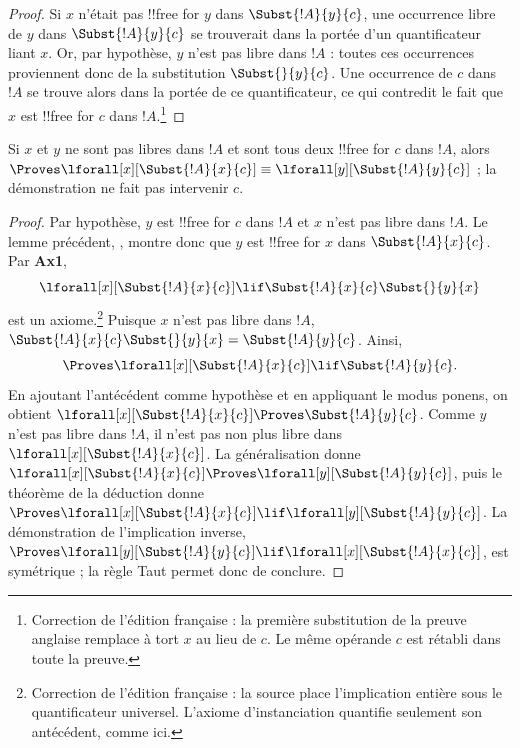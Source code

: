 \documentclass[../../../include/open-logic-section]{subfiles}
\begin{document}
\begin{proof}
Si $x$ n'était pas !!{free for} $y$ dans
$\Subst{!A}{y}{c}$, une occurrence libre de $y$ dans
$\Subst{!A}{y}{c}$ se trouverait dans la portée d'un
quantificateur liant $x$. Or, par hypothèse, $y$ n'est
pas libre dans $!A$ : toutes ces occurrences proviennent
donc de la substitution $\Subst{}{y}{c}$. Une occurrence
de $c$ dans $!A$ se trouve alors dans la portée de ce
quantificateur, ce qui contredit le fait que $x$ est
!!{free for} $c$ dans $!A$.\footnote{Correction de l'édition
française : la première substitution de la preuve anglaise
remplace à tort $x$ au lieu de $c$. Le même opérande $c$
est rétabli dans toute la preuve.}
\end{proof}

\begin{lem}
Si $x$ et $y$ ne sont pas libres dans $!A$ et sont tous deux
!!{free for} $c$ dans $!A$, alors
$\Proves\lforall[x][\Subst{!A}{x}{c}]
\equiv\lforall[y][\Subst{!A}{y}{c}]$ ; la démonstration
ne fait pas intervenir $c$.
\end{lem}

\begin{proof}
Par hypothèse, $y$ est !!{free for} $c$ dans $!A$ et
$x$ n'est pas libre dans $!A$. Le lemme précédent,
, montre donc que $y$ est !!{free for}
$x$ dans $\Subst{!A}{x}{c}$. Par \textbf{Ax1},
\[
\lforall[x][\Subst{!A}{x}{c}]
\lif\Subst{!A}{x}{c}\Subst{}{y}{x}
\]
est un axiome.\footnote{Correction de l'édition française :
la source place l'implication entière sous le quantificateur
universel. L'axiome d'instanciation quantifie seulement son
antécédent, comme ici.}
Puisque $x$ n'est pas libre dans $!A$,
$\Subst{!A}{x}{c}\Subst{}{y}{x}=\Subst{!A}{y}{c}$.
Ainsi,
\[
\Proves\lforall[x][\Subst{!A}{x}{c}]
\lif\Subst{!A}{y}{c}.
\]
En ajoutant l'antécédent comme hypothèse et en appliquant le
modus ponens, on obtient
$\lforall[x][\Subst{!A}{x}{c}]\Proves\Subst{!A}{y}{c}$.
Comme $y$ n'est pas libre dans $!A$, il n'est pas non plus
libre dans $\lforall[x][\Subst{!A}{x}{c}]$.
La généralisation donne
$\lforall[x][\Subst{!A}{x}{c}]
\Proves\lforall[y][\Subst{!A}{y}{c}]$,
puis le théorème de la déduction donne
$\Proves\lforall[x][\Subst{!A}{x}{c}]
\lif\lforall[y][\Subst{!A}{y}{c}]$.
La démonstration de l'implication inverse,
$\Proves\lforall[y][\Subst{!A}{y}{c}]
\lif\lforall[x][\Subst{!A}{x}{c}]$,
est symétrique ; la règle Taut permet donc de conclure.
\end{proof}
\end{document}
